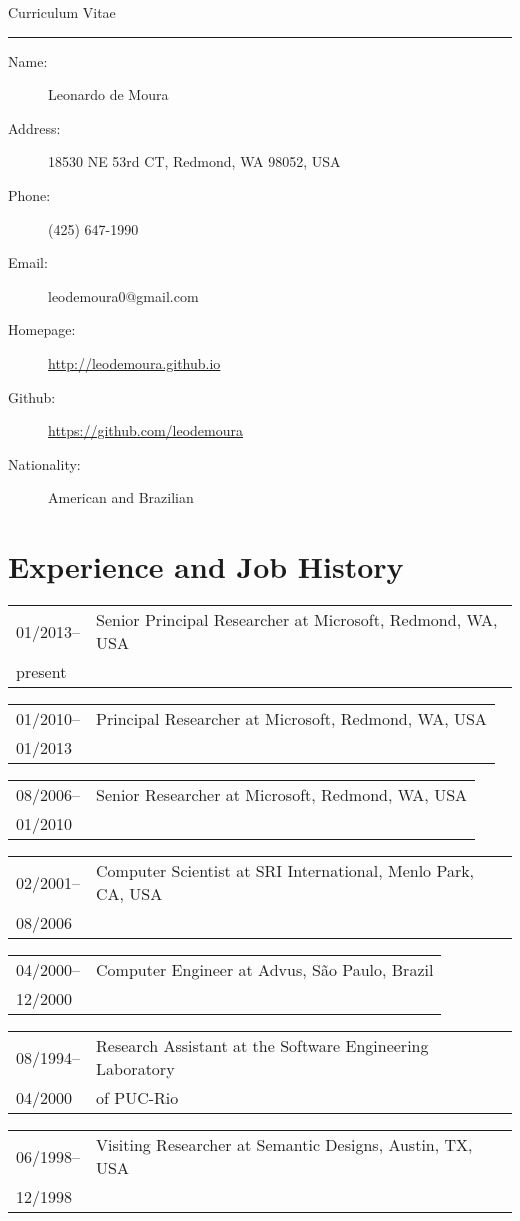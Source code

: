 \documentclass{article}
\newcommand{\job}[4]{\begin{flushleft}
                                        \begin{tabular}{ll}
                                         #1-- & #3 \\
                     #2 & #4 \\
                    \end{tabular}
                                        \end{flushleft}
                    }
\begin{document}
{
\begin{flushleft}
{\Huge{Curriculum Vitae}} \\
\hspace{.1in}
\hrule
\end{flushleft}
}




\begin{description}
\item [Name:] Leonardo de Moura
\item [Address:] 18530 NE 53rd CT, Redmond, WA 98052, USA
\item [Phone:] (425) 647-1990
\item [Email:] leodemoura0@gmail.com
\item [Homepage:] \url{http://leodemoura.github.io}
\item [Github:] \url{https://github.com/leodemoura}
\item [Nationality:] American and Brazilian
\end{description}

\section*{Experience and Job History}

\job{01/2013}{present}{Senior Principal Researcher at Microsoft, Redmond, WA, USA}{}

\job{01/2010}{01/2013}{Principal Researcher at Microsoft, Redmond, WA, USA}{}

\job{08/2006}{01/2010}{Senior Researcher at Microsoft, Redmond, WA, USA}{}

\job{02/2001}{08/2006}{Computer Scientist at SRI International, Menlo Park, CA, USA}{}

\job{04/2000}{12/2000}{Computer Engineer at Advus, S\~{a}o Paulo, Brazil}{}

\job{08/1994}{04/2000}{Research Assistant at the Software Engineering Laboratory}{of PUC-Rio}

\job{06/1998}{12/1998}{Visiting Researcher at Semantic Designs, Austin, TX, USA}{}
\end{document}
